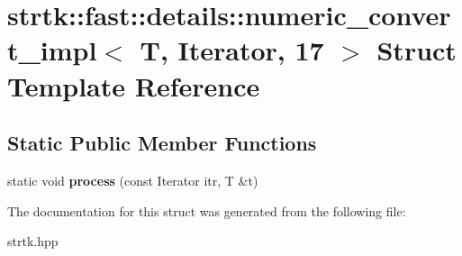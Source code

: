 \hypertarget{structstrtk_1_1fast_1_1details_1_1numeric__convert__impl_3_01T_00_01Iterator_00_0117_01_4}{\section{strtk\-:\-:fast\-:\-:details\-:\-:numeric\-\_\-convert\-\_\-impl$<$ T, Iterator, 17 $>$ Struct Template Reference}
\label{structstrtk_1_1fast_1_1details_1_1numeric__convert__impl_3_01T_00_01Iterator_00_0117_01_4}
}
\subsection*{Static Public Member Functions}
\begin{DoxyCompactItemize}
\item 
\hypertarget{structstrtk_1_1fast_1_1details_1_1numeric__convert__impl_3_01T_00_01Iterator_00_0117_01_4_a962deb429f0b99bf453c2d52f1e33c9c}{static void {\bfseries process} (const Iterator itr, T \&t)}\label{structstrtk_1_1fast_1_1details_1_1numeric__convert__impl_3_01T_00_01Iterator_00_0117_01_4_a962deb429f0b99bf453c2d52f1e33c9c}

\end{DoxyCompactItemize}


The documentation for this struct was generated from the following file\-:\begin{DoxyCompactItemize}
\item 
strtk.\-hpp\end{DoxyCompactItemize}

